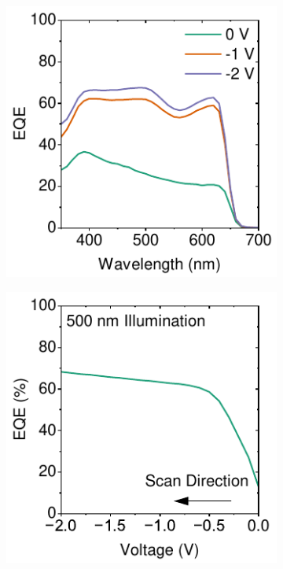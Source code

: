 \begin{figure}[ht!]
    \vspace{0.5em} %
    
    \begin{subfigure}{0.4\textwidth}
        \centering
        \includegraphics[width=\textwidth]{chapters/transport_layers/images/AP40_4_EQE.pdf}
        \caption{}
        \label{}
    \end{subfigure}
    \hspace{0.5cm}
    \begin{subfigure}{0.4\textwidth}
        \centering
        \includegraphics[width=\textwidth]{chapters/transport_layers/images/AP40_4_EQE_fV.pdf}
        \caption{}
        \label{}
    \end{subfigure}
    

\end{figure}
